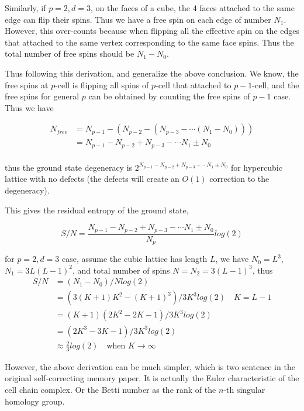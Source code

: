 \documentclass[11pt]{article}
\begin{document}
Similarly, if $p=2, d=3$, on the faces of a cube, the 4 faces attached to the same
edge can flip their spins. Thus we have a free spin on each edge of number $N_1$.
However, this over-counts because when flipping all the effective spin on the edges that
attached to the same vertex corresponding to the same face spins. Thus the total
number of free spins should be $N_1 - N_0$.

Thus following this derivation, and generalize the above conclusion.
We know, the free spins at $p$-cell is flipping
all spins of $p$-cell that attached to $p-1$-cell,
and the free spins for general $p$ can be obtained by counting
the free spins of $p-1$ case. Thus we have

$$
\begin{aligned}
    N_{free} &= N_{p-1} - (N_{p-2} - (N_{p-3} - \cdots (N_1 - N_0)))\\
    &=N_{p-1} - N_{p-2} + N_{p-3} - \cdots N_1 \pm N_0\\
\end{aligned}
$$

thus the ground state degeneracy is $2^{N_{p-1} - N_{p-2} + N_{p-3} - \cdots N_1 \pm N_0}$
for hypercubic lattice with no defects (the defects will create an $O(1)$ correction to
the degeneracy).

This gives the residual entropy of the ground state,

$$
S/N = \frac{N_{p-1} - N_{p-2} + N_{p-3} - \cdots N_1 \pm N_0}{N_p} log(2)
$$

for $p=2,d=3$ case, assume the cubic lattice has length $L$,
we have $N_0 = L^3$, $N_1 = 3L(L-1)^2$, and total number of
spins $N=N_2=3(L-1)^3$, thus
$$
\begin{aligned}
    S/N &= (N_1 - N_0)/N log(2)\\
    &= (3(K+1)K^2 - (K+1)^3)/3K^3 log(2) \quad K = L-1\\
    &= (K+1)(2K^2 - 2K - 1)/3K^3 log(2)\\
    &= (2K^3 - 3K - 1)/3K^3 log(2)\\
    &\approx \frac{2}{3} log(2) \quad \text{when }K \rightarrow \infty
\end{aligned}
$$

\begin{figure}[h]
    \centering
    
\end{figure}

However, the above derivation can be much simpler, which is two sentence in the original
self-correcting memory paper\cite{hastings2014self}. It is actually the Euler characteristic
of the cell chain complex. Or the Betti number as the rank of the $n$-th singular homology
group\cite{wiki-euler-characteristic,algebra-topology-sjer}.
\end{document}
